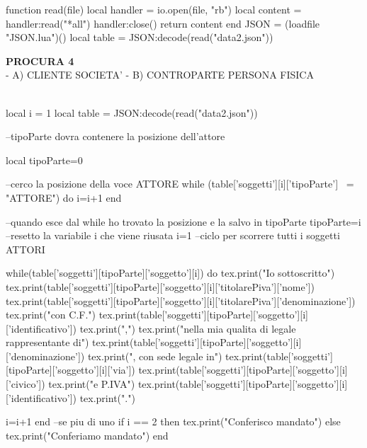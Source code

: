 \documentclass{article}
\begin{document}
\begin{luacode}

function read(file)
    local handler = io.open(file, "rb")
    local content = handler:read("*all")
    handler:close()
    return content
end
JSON = (loadfile "JSON.lua")()
local table = JSON:decode(read("data2.json"))
\end{luacode}


\textbf{PROCURA 4}\\
- A) CLIENTE SOCIETA' - B) CONTROPARTE PERSONA FISICA\\
\vspace*{0.3cm}\\
\begin{luacode}
 local i = 1
 local table = JSON:decode(read("data2.json"))
 
--tipoParte dovra contenere la posizione dell'attore

 local tipoParte=0
 
 --cerco la posizione della voce ATTORE
 while (table['soggetti'][i]['tipoParte'] ~= "ATTORE") do
  i=i+1
 end
 
 --quando esce dal while ho trovato la posizione e la salvo in tipoParte
 tipoParte=i
 --resetto la variabile i che viene riusata
 i=1
 --ciclo per scorrere tutti i soggetti ATTORI
 
 while(table['soggetti'][tipoParte]['soggetto'][i]) do
  tex.print("Io sottoscritto")
  tex.print(table['soggetti'][tipoParte]['soggetto'][i]['titolarePiva']['nome'])
  tex.print(table['soggetti'][tipoParte]['soggetto'][i]['titolarePiva']['denominazione'])
  tex.print("con C.F.")
  tex.print(table['soggetti'][tipoParte]['soggetto'][i]['identificativo'])
  tex.print(",")
  tex.print("nella mia qualita di legale rappresentante di")
  tex.print(table['soggetti'][tipoParte]['soggetto'][i]['denominazione'])
  tex.print(", con sede legale in")
  tex.print(table['soggetti'][tipoParte]['soggetto'][i]['via'])
  tex.print(table['soggetti'][tipoParte]['soggetto'][i]['civico'])
  tex.print("e P.IVA")
  tex.print(table['soggetti'][tipoParte]['soggetto'][i]['identificativo'])
  tex.print(".")
  
  i=i+1
 end
 --se piu di uno 
 if i == 2 then
   tex.print("Conferisco mandato")
   else
   tex.print("Conferiamo mandato")
 end

\end{luacode}
\end{document}
